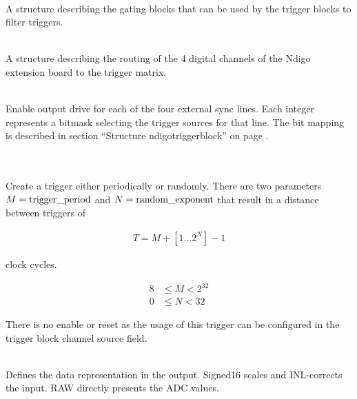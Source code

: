             \\
            A structure describing the gating blocks that can be used by the trigger blocks to filter triggers.\par

            \\
            A structure describing the routing of the 4 digital channels of the Ndigo extension board to the trigger matrix.\par

            \\
            Enable output drive for each of the four external sync lines. Each integer represents a bitmask selecting the trigger sources for that line. The bit mapping is described in section ``Structure \textsf{ndigo\tu trigger\tu block}'' on page \pageref{cp:triggerblock}.\par

            \\
            \\
            Create a trigger either periodically or randomly. There are two parameters $M = \text{trigger\textunderscore period}$ and $N = \text{random\textunderscore exponent}$ that result in a distance between triggers of

            \begin{align}
                T = M + [1...2^N] - 1
            \end{align}

            clock cycles.

            \begin{align}
                8 &\leq M < 2^{32}\\
                0 &\leq N < 32
            \end{align}

            There is no enable or reset as the usage of this trigger can be configured in the trigger block channel source field.\par

            \\
            Defines the data representation in the output. Signed16 scales and INL-corrects the input. RAW directly presents the ADC values.\par

